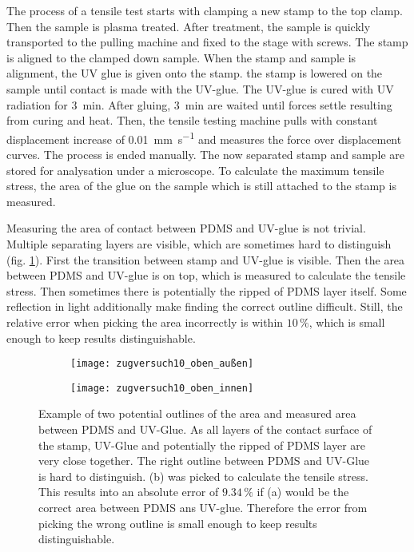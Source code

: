 The process of a tensile test starts with clamping a new stamp to the top clamp. Then the sample is plasma treated. After treatment, the sample is quickly transported to the pulling machine and fixed to the stage with screws. The stamp is aligned to the clamped down sample. When the stamp and sample is alignment, the UV glue is given onto the stamp. the stamp is lowered on the sample until contact is made with the UV-glue. The UV-glue is cured with UV radiation for \SI{3}{\minute}. After gluing, \SI{3}{\minute} are waited until forces settle resulting from curing and heat. Then, the tensile testing machine pulls with constant displacement increase of \SI{0,01}{\milli\meter\per\second} and measures the force over displacement curves. The process is ended manually. The now separated stamp and sample are stored for analysation under a microscope. To calculate the maximum tensile stress, the area of the glue on the sample which is still attached to the stamp is measured.

Measuring the area of contact between PDMS and UV-glue is not trivial. Multiple separating layers are visible, which are sometimes hard to distinguish (fig. \ref{fig:AreaStamp}). First the transition between stamp and UV-glue is visible. Then the area between PDMS and UV-glue is on top, which is measured to calculate the tensile stress. Then sometimes there is potentially the ripped of PDMS layer itself. Some reflection in light additionally make finding the correct outline difficult. Still, the relative error when picking the area incorrectly is within $10\,\%$, which is small enough to keep results distinguishable.

\begin{figure}[hbt!]
	\centering
	\begin{subfigure}[]{0.45\textwidth}
		\centering
		\texttt{[image: zugversuch10\_oben\_außen]}
		\caption{}
	\end{subfigure}
	\begin{subfigure}[]{0.45\textwidth}
		\centering
		\texttt{[image: zugversuch10\_oben\_innen]}
		\caption{}
	\end{subfigure}
	\caption{Example of two potential outlines of the area and measured area between PDMS and UV-Glue. As all layers of the contact surface of the stamp, UV-Glue and potentially the ripped of PDMS layer are very close together. The right outline between PDMS and UV-Glue is hard to distinguish. (b) was picked to calculate the tensile stress. This results into an absolute error of $9.34\,\%$ if (a) would be the correct area between PDMS ans UV-glue. Therefore the error from picking the wrong outline is small enough to keep results distinguishable.}
	\label{fig:AreaStamp}
\end{figure}

